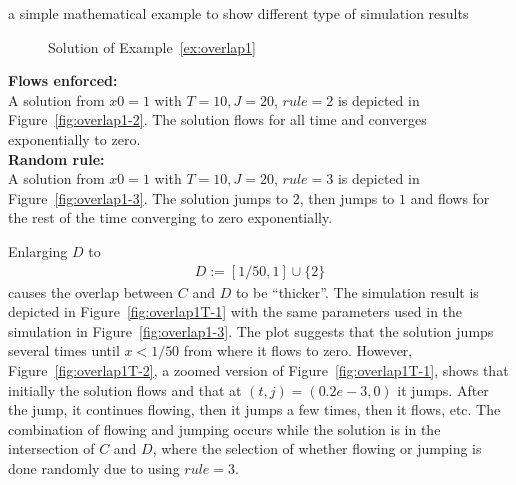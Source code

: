 \begin{example}{a simple mathematical example to show different type of simulation results}
\begin{figure}[ht]
\caption{Solution of Example~\ref{ex:overlap1}}
\end{figure}


{\bf Flows enforced:}
\\

A solution from $x0=1$ with $T=10,J=20$, $rule = 2$ is depicted in
Figure~\ref{fig:overlap1-2}. The solution flows for all time
and converges exponentially to zero.
\\


{\bf Random rule:}
\\

A solution from $x0=1$ with $T=10,J=20$, $rule = 3$ is depicted in
Figure~\ref{fig:overlap1-3}. The solution jumps to $2$, then jumps to
$1$ and flows for the rest of the time converging to zero
exponentially.


Enlarging $D$ to
\begin{eqnarray*}
D:=  [1/50,1]\cup\{2\}
\end{eqnarray*}
causes the overlap between $C$ and $D$ to be ``thicker''.
The simulation result is
depicted in Figure~\ref{fig:overlap1T-1}
with the same parameters used in the simulation in
Figure~\ref{fig:overlap1-3}.
The plot suggests that the solution jumps several times until
$x<1/50$ from where it flows to zero.  However,
Figure~\ref{fig:overlap1T-2},
a zoomed version of Figure~\ref{fig:overlap1T-1},
shows that initially the
solution flows and that at $(t,j)=(0.2 e-3,0)$ it jumps. After the jump,
it continues flowing, then it jumps a few times, then it flows, etc.
The combination of flowing and jumping occurs while the solution
is in the intersection of $C$ and $D$, where the selection
of whether flowing or jumping is done randomly due to using $rule=3$.


\end{example}
